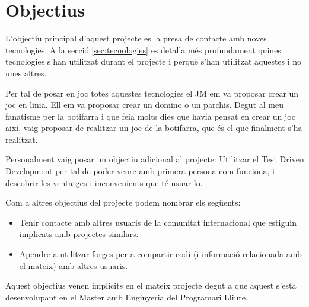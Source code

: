 \section{Objectius}

L'objectiu principal d'aquest projecte es la presa de contacte amb noves tecnologies. A la secció \ref{sec:tecnologies} es detalla més profundament quines tecnologies s'han utilitzat durant el projecte i perquè s'han utilitzat aquestes i no unes altres. 

Per tal de posar en joc totes aquestes tecnologies el JM em va proposar crear un joc en linia. Ell em va proposar crear un domino o un parchis. Degut al meu fanatisme per la botifarra i que feia molts dies que havia pensat en crear un joc així, vaig proposar de realitzar un joc de la botifarra, que és el que finalment s'ha realitzat. 

Personalment vaig posar un objectiu adicional al projecte: Utilitzar el Test Driven Development per tal de poder veure amb primera persona com funciona, i descobrir les ventatges i inconvenients que té usuar-lo. 

Com a altres objectius del projecte podem nombrar els següents: 
\begin{itemize}
	\item{Tenir contacte amb altres usuaris de la comunitat internacional que estiguin implicats amb projectes similars.}
	\item{Apendre a utilitzar forges per a compartir codi (i informació relacionada amb el mateix) amb altres usuaris.}
\end{itemize} 

Aquest objectius venen implícits en el mateix projecte degut a que aquest s'està desenvolupant en el Master amb Enginyeria del Programari Lliure. 

